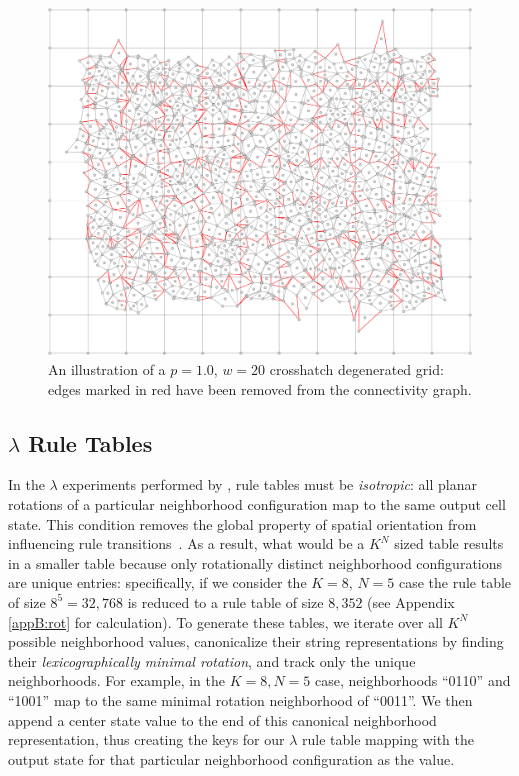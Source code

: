 \documentclass[a4paper,11pt]{article}
\begin{document}
\begin{figure}[htp]
\centering
\includegraphics[width=1.0\textwidth]{ch3_figs/ch_p100_w20}
\caption[Crosshatching Degeneration]{
	An illustration of a $p=1.0$, $w=20$ crosshatch degenerated grid: edges marked in red have been removed from the connectivity graph.
}
\label{fig:crosshatch_degen}
\end{figure}

\subsection{$\lambda$ Rule Tables}
\label{subsec:ch3_lamb}
In the $\lambda$ experiments performed by \citeauthor{wo90}, rule tables must be \textit{isotropic}: all planar rotations of a particular neighborhood configuration map to the same output cell state. This condition removes the global property of spatial orientation from influencing rule transitions~\cite{av00,wo90}. As a result, what would be a $K^N$ sized table results in a smaller table because only rotationally distinct neighborhood configurations are unique entries: specifically, if we consider the $K=8$, $N=5$ case the rule table of size $8^5 = 32,768$ is reduced to a rule table of size $8,352$ (see Appendix \ref{appB:rot} for calculation). To generate these tables, we iterate over all $K^N$ possible neighborhood values, canonicalize their string representations by finding their \textit{lexicographically minimal rotation}, and track only the unique neighborhoods. For example, in the $K=8, N=5$ case, neighborhoods ``0110'' and ``1001'' map to the same minimal rotation neighborhood of ``0011''. We then append a center state value to the end of this canonical neighborhood representation, thus creating the keys for our $\lambda$ rule table mapping with the output state for that particular neighborhood configuration as the value.
\end{document}
